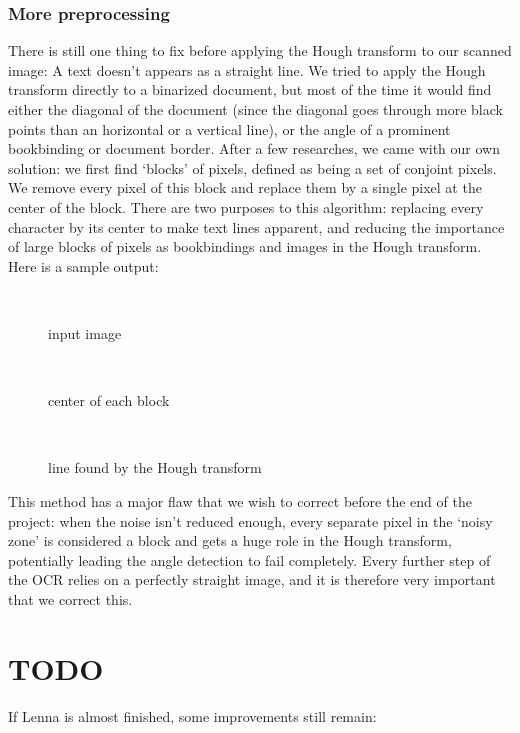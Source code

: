 \subsubsection{More preprocessing}

There is still one thing to fix before applying the Hough transform to our
scanned image: A text doesn't appears as a straight line. We tried to apply the
Hough transform directly to a binarized document, but most of the time it would
find either the diagonal of the document (since the diagonal goes through more
black points than an horizontal or a vertical line), or the angle of a prominent
bookbinding or document border. After a few researches, we came with our own
solution: we first find `blocks' of pixels, defined as being a set of conjoint
pixels. We remove every pixel of this block and replace them by a single pixel
at the center of the block. There are two purposes to this algorithm: replacing
every character by its center to make text lines apparent, and reducing the
importance of large blocks of pixels as bookbindings and images in the Hough
transform. Here is a sample output:\\

\begin{figure}[h!]\
    \centering
    \caption{input image}
\end{figure}
\begin{figure}[h!]\
    \centering
    \caption{center of each block}
\end{figure}
\begin{figure}[h!]\
    \centering
    \caption{line found by the Hough transform}
\end{figure}

This method has a major flaw that we wish to correct before the end of the
project: when the noise isn't reduced enough, every separate pixel in the
`noisy zone' is considered a block and gets a huge role in the Hough transform,
potentially leading the angle detection to fail completely. Every further step
of the OCR relies on a perfectly straight image, and it is therefore very
important that we correct this. \\

\section{TODO}

If Lenna is almost finished, some improvements still remain:

